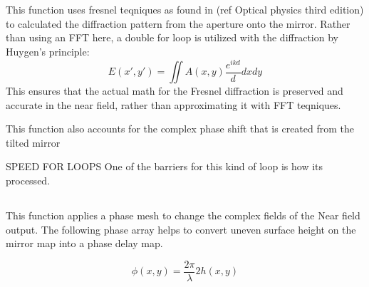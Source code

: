 \documentclass[twoside]{article}
\begin{document}
\section*{}
This function uses fresnel teqniques as found in (ref Optical physics third edition) to calculated the diffraction pattern from the aperture onto the mirror. 
Rather than using an FFT here, a double for loop is utilized with the diffraction by Huygen's principle:
\begin{equation*}
    E(x',y') = \iint A(x,y) \frac{e^{ikd}}{d} dx dy 
\end{equation*}
This ensures that the actual math for the Fresnel diffraction is preserved and accurate in the near field, rather than approximating it with FFT teqniques. 

This function also accounts for the complex phase shift that is created from the tilted mirror 


SPEED FOR LOOPS
One of the barriers for this kind of loop is how its processed. 






\subsection*{}

This function applies a phase mesh to change the complex fields of the Near field output. The following phase array helps to convert uneven surface height on the mirror map into a phase delay map.

\begin{equation}
    \phi(x,y) = \frac{2 \pi}{\lambda} 2 h(x,y)
\end{equation}
\end{document}

